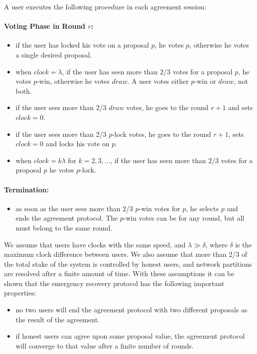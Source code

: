 A user executes the following procedure in each agreement session:
\paragraph{Voting Phase in Round $r$:}
\begin{itemize}
    \item if the user has locked his vote on a proposal $p$, he votes $p$, otherwise he votes a single desired
    proposal.
    \item when $clock = \lambda$, if the user has seen more than $2/3$ votes for a proposal $p$, he votes $p$-win,
    otherwise he votes $draw$. A user votes either $p$-win or $draw$, not both.
    \item if the user sees more than 2/3 $draw$ votes, he goes to the round $r+1$ and sets $clock=0$.
    \item if the user sees more than 2/3 $p$-lock votes, he goes to the round $r+1$, sets $clock=0$ and locks his
    vote on $p$.
    \item when $clock = k \lambda$ for $k=2,3,\dots$, if the user has seen more than $2/3$ votes for a proposal
    $p$ he votes $p$-lock.
\end{itemize}

\paragraph{Termination:}
\begin{itemize}
    \item as soon as the user sees more than 2/3 $p$-win votes for $p$, he selects $p$ and ends
    the agreement protocol. The $p$-win votes can be for any round, but all must belong to the same round.
\end{itemize}


We assume that users have clocks with the same speed, and $\lambda \gg \delta$, where $\delta$ is the maximum
clock difference between users. We also assume that more than 2/3 of the total stake of the system is controlled
by honest users, and network partitions are resolved after a finite amount of time. With these assumptions it can be
shown that the emergency recovery protocol has the following important properties:
\begin{itemize}
    \item no two users will end the agreement protocol with two different proposals as the result of the agreement.
    \item if honest users can agree upon some proposal value, the agreement protocol will converge to that value
    after a finite number of rounds.
\end{itemize}

